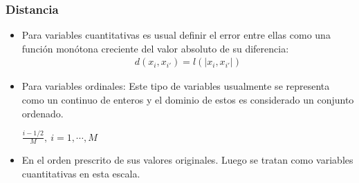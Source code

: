 \documentclass[
  shownotes,
  xcolor={svgnames},
  hyperref={colorlinks,citecolor=DarkBlue,linkcolor=DarkRed,urlcolor=DarkBlue}
  , aspectratio=169]{beamer}
\begin{document}
\begin{frame}
\frametitle{Distancia}

\begin{itemize}


\item Para variables cuantitativas es usual definir el error entre ellas como una función monótona creciente del valor absoluto de su diferencia:
\begin{align}
d(x_i, x_{i'})=l(|x_i, x_{i'}|)
\end{align}

\medskip
\item Para variables ordinales: Este tipo de variables usualmente se representa como un continuo de enteros y el dominio de estos es considerado un conjunto ordenado. 

\medskip
$\frac{i-1/2}{M},\ i=1,\cdots,M$ 

\medskip
\item En el orden prescrito de sus valores originales. Luego se tratan como variables cuantitativas en esta escala.

\end{itemize}

\end{frame}
\end{document}
